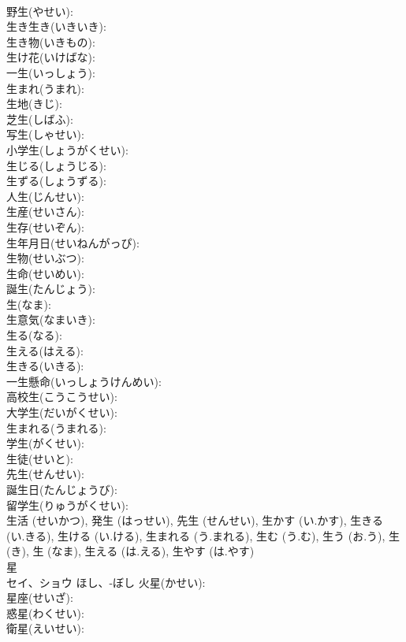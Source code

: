 \documentclass[8pt]{extreport}
\begin{document}
\begin{CJK}{UTF8}{min}
\\	野生(やせい): 
\\	生き生き(いきいき): 
\\	生き物(いきもの): 
\\	生け花(いけばな): 
\\	一生(いっしょう): 
\\	生まれ(うまれ): 
\\	生地(きじ): 
\\	芝生(しばふ): 
\\	写生(しゃせい): 
\\	小学生(しょうがくせい): 
\\	生じる(しょうじる): 
\\	生ずる(しょうずる): 
\\	人生(じんせい): 
\\	生産(せいさん): 
\\	生存(せいぞん): 
\\	生年月日(せいねんがっぴ): 
\\	生物(せいぶつ): 
\\	生命(せいめい): 
\\	誕生(たんじょう): 
\\	生(なま): 
\\	生意気(なまいき): 
\\	生る(なる): 
\\	生える(はえる): 
\\	生きる(いきる): 
\\	一生懸命(いっしょうけんめい): 
\\	高校生(こうこうせい): 
\\	大学生(だいがくせい): 
\\	生まれる(うまれる): 
\\	学生(がくせい): 
\\	生徒(せいと): 
\\	先生(せんせい): 
\\	誕生日(たんじょうび): 
\\	留学生(りゅうがくせい): 
\\	生活 (せいかつ), 発生 (はっせい), 先生 (せんせい), 生かす (い.かす), 生きる (い.きる), 生ける (い.ける), 生まれる (う.まれる), 生む (う.む), 生う (お.う), 生 (き), 生 (なま), 生える (は.える), 生やす (は.やす)
\\	星			
\\	セイ、ショウ	ほし、-ぼし	火星(かせい): 
\\	星座(せいざ): 
\\	惑星(わくせい): 
\\	衛星(えいせい): 

\end{CJK}
\end{document}
